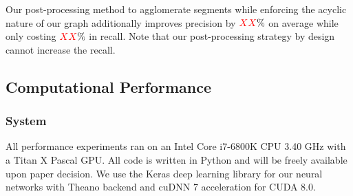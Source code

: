 Our post-processing method to agglomerate segments while enforcing the acyclic nature of our graph additionally improves precision by $\textcolor{red}{XX}\%$ on average while only costing $\textcolor{red}{XX}\%$ in recall. 
Note that our post-processing strategy by design cannot increase the recall. 

\subsection{Computational Performance}

\subsubsection{System} All performance experiments ran on an Intel Core i7-6800K CPU 3.40 GHz with a Titan X Pascal GPU. All code is written in Python and will be freely available upon paper decision. We use the Keras deep learning library for our neural networks with Theano backend and cuDNN 7 acceleration for CUDA 8.0.
